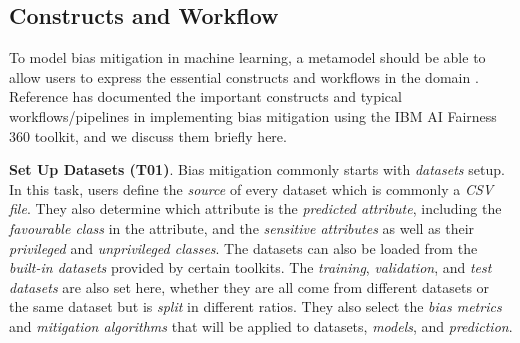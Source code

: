 \documentclass[sigconf,review]{acmart}
\begin{document}
	
	
	\subsection{Constructs and Workflow}
	\label{sec:constructs_and_workflow}
	
	To model bias mitigation in machine learning, a metamodel should be able to allow users to express the essential constructs and workflows in the domain \cite{volter2013model}. Reference \cite{bellamy2018ai} has documented the important constructs and typical workflows/pipelines in implementing bias mitigation using the IBM AI Fairness 360 toolkit, and we discuss them briefly here.
	
	
	\textbf{Set Up Datasets (T01)}. Bias mitigation commonly starts with \textit{datasets} setup. In this task, users define the \textit{source} of every dataset which is commonly a \textit{CSV file}. They also determine which attribute is the \textit{predicted attribute}, including the \textit{favourable class} in the attribute, and the \textit{sensitive attributes} as well as their \textit{privileged} and \textit{unprivileged classes}. The datasets can also be loaded from the \textit{built-in datasets} provided by certain toolkits. 
	The \textit{training}, \textit{validation}, and \textit{test datasets} are also set here, whether they are all come from different datasets or the same dataset but is \textit{split} in different ratios. They also select the \textit{bias metrics} and \textit{mitigation algorithms} that will be applied to datasets, \textit{models}, and \textit{prediction}. 
	
\end{document}
